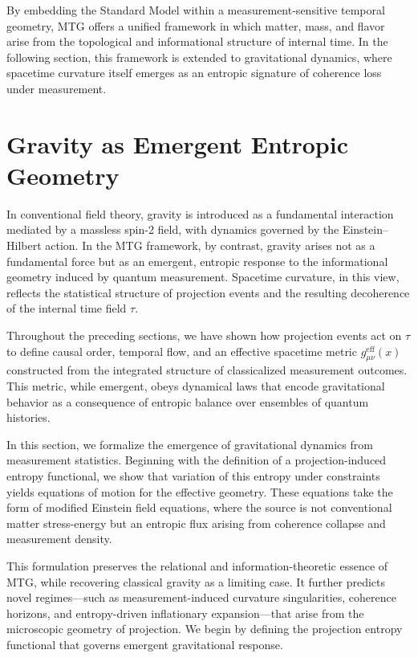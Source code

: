\documentclass[11pt]{article}
\begin{document}
By embedding the Standard Model within a measurement-sensitive temporal geometry, MTG offers a unified framework in which matter, mass, and flavor arise from the topological and informational structure of internal time. In the following section, this framework is extended to gravitational dynamics, where spacetime curvature itself emerges as an entropic signature of coherence loss under measurement.


\section{Gravity as Emergent Entropic Geometry}\label{sec:6}
In conventional field theory, gravity is introduced as a fundamental interaction mediated by a massless spin-2 field, with dynamics governed by the Einstein--Hilbert action. In the MTG framework, by contrast, gravity arises not as a fundamental force but as an emergent, entropic response to the informational geometry induced by quantum measurement. Spacetime curvature, in this view, reflects the statistical structure of projection events and the resulting decoherence of the internal time field \( \tau \).

Throughout the preceding sections, we have shown how projection events act on \( \tau \) to define causal order, temporal flow, and an effective spacetime metric \( g^{\mathrm{eff}}_{\mu\nu}(x) \) constructed from the integrated structure of classicalized measurement outcomes. This metric, while emergent, obeys dynamical laws that encode gravitational behavior as a consequence of entropic balance over ensembles of quantum histories.

In this section, we formalize the emergence of gravitational dynamics from measurement statistics. Beginning with the definition of a projection-induced entropy functional, we show that variation of this entropy under constraints yields equations of motion for the effective geometry. These equations take the form of modified Einstein field equations, where the source is not conventional matter stress-energy but an entropic flux arising from coherence collapse and measurement density.

This formulation preserves the relational and information-theoretic essence of MTG, while recovering classical gravity as a limiting case. It further predicts novel regimes---such as measurement-induced curvature singularities, coherence horizons, and entropy-driven inflationary expansion---that arise from the microscopic geometry of projection. We begin by defining the projection entropy functional that governs emergent gravitational response.
\end{document}
